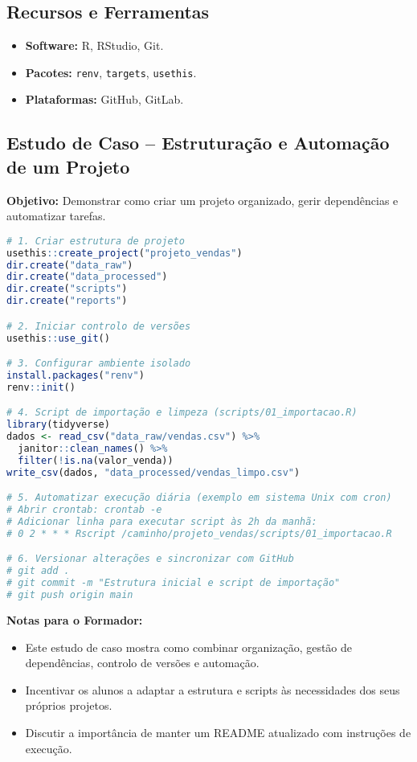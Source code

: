 \subsection{\textcolor{subsectionblue}{Recursos e Ferramentas}}
\begin{itemize}
  \item \textbf{Software:} R, RStudio, Git.
  \item \textbf{Pacotes:} \texttt{renv}, \texttt{targets}, \texttt{usethis}.
  \item \textbf{Plataformas:} GitHub, GitLab.
\end{itemize}

\subsection{\textcolor{subsectionblue}{Estudo de Caso – Estruturação e Automação de um Projeto}}
\textbf{Objetivo:} Demonstrar como criar um projeto organizado, gerir dependências e automatizar tarefas.

\begin{lstlisting}[language=R]
# 1. Criar estrutura de projeto
usethis::create_project("projeto_vendas")
dir.create("data_raw")
dir.create("data_processed")
dir.create("scripts")
dir.create("reports")

# 2. Iniciar controlo de versões
usethis::use_git()

# 3. Configurar ambiente isolado
install.packages("renv")
renv::init()

# 4. Script de importação e limpeza (scripts/01_importacao.R)
library(tidyverse)
dados <- read_csv("data_raw/vendas.csv") %>%
  janitor::clean_names() %>%
  filter(!is.na(valor_venda))
write_csv(dados, "data_processed/vendas_limpo.csv")

# 5. Automatizar execução diária (exemplo em sistema Unix com cron)
# Abrir crontab: crontab -e
# Adicionar linha para executar script às 2h da manhã:
# 0 2 * * * Rscript /caminho/projeto_vendas/scripts/01_importacao.R

# 6. Versionar alterações e sincronizar com GitHub
# git add .
# git commit -m "Estrutura inicial e script de importação"
# git push origin main
\end{lstlisting}

\textbf{Notas para o Formador:}
\begin{itemize}
  \item Este estudo de caso mostra como combinar organização, gestão de dependências, controlo de versões e automação.
  \item Incentivar os alunos a adaptar a estrutura e scripts às necessidades dos seus próprios projetos.
  \item Discutir a importância de manter um README atualizado com instruções de execução.
\end{itemize}
